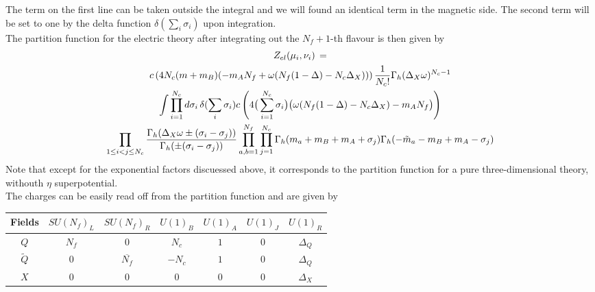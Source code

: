The term on the first line can be taken outside the integral and we will found an identical term in the magnetic side.
The second term will be set to one by the delta function $\delta(\sum_i \sigma_i)$ upon integration.\\
The partition function for the electric theory after integrating out the $N_f +1$-th flavour is then given by
\begin{multline}
 Z_{el} ( \mu_i , \nu_i )\,  =  \\
 c \left( 4 N_c  ( m  + m_B ) (-  m_A N_f   + \omega ( N_f (1 - \Delta)  - N_c \Delta_X ) ) \right) 
 {1 \over N_c ! }
\Gamma_h ( \Delta_X \omega )^{N_c-1} 
\\ \int
\prod_{i=1}^{N_c} d \sigma_i \, \delta( \sum_i \sigma_i)  c \left( 4\big( \sum_{i=1}^{N_c}  \sigma_i  \big) \big( \omega( N_f (1 - \Delta)  - N_c \Delta_X)  -  m_A N_f \big) \right) 
\\
   \prod_{ 1 \leq i<j \leq N_c} \frac{ \Gamma_h( \Delta_X \omega \pm (\sigma_i - \sigma_j)) }{ \Gamma_h ( \pm (\sigma_i - \sigma_j) )}
 \prod_{a,b=1}^{N_f} \prod_{j=1}^{N_c} \Gamma_h ( m_a + m_B + m_A + \sigma_j) \Gamma_h ( -\tilde{m}_a -m_B + m_A - \sigma_j)
\end{multline}
Note that except for the exponential factors discuessed above, it corresponds to the partition function for a pure three-dimensional theory, withouth $\eta$ superpotential.\\
The charges can be easily read off from the partition function and are given by 
\begin{table}[h!]
 \begin{tabular}{|c |c |c |c |c |c |c |}
\hline
Fields & $SU(N_f)_L$ & $SU(N_f)_R$ & $U(1)_B$ & $U(1)_A$ & $U(1)_J$ & $U(1)_R $ \\
\hline
$Q$ & $N_f$ & 0  &$ N_c $& $1 $& 0  & $\Delta_Q$ \\
$\tilde{Q} $  & 0  &$\overline{N_f}$ & $ - N_c $& $1 $ & 0 & $\Delta_Q$ \\
$X$ & 0 & 0 & 0 & 0 &0 & $\Delta_X$ \\
\hline
\end{tabular}
\centering
\end{table}


